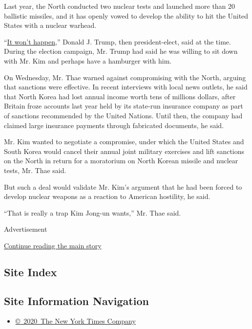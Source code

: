 Last year, the North conducted two nuclear tests and launched more than
20 ballistic missiles, and it has openly vowed to develop the ability to
hit the United States with a nuclear warhead.

``\href{https://www.nytimes.com/2017/01/02/world/asia/trump-twitter-north-korea-missiles-china.html}{It
won't happen},'' Donald J. Trump, then president-elect, said at the
time. During the election campaign, Mr. Trump had said he was willing to
sit down with Mr. Kim and perhaps have a hamburger with him.

On Wednesday, Mr. Thae warned against compromising with the North,
arguing that sanctions were effective. In recent interviews with local
news outlets, he said that North Korea had lost annual income worth tens
of millions dollars, after Britain froze accounts last year held by its
state-run insurance company as part of sanctions recommended by the
United Nations. Until then, the company had claimed large insurance
payments through fabricated documents, he said.

Mr. Kim wanted to negotiate a compromise, under which the United States
and South Korea would cancel their annual joint military exercises and
lift sanctions on the North in return for a moratorium on North Korean
missile and nuclear tests, Mr. Thae said.

But such a deal would validate Mr. Kim's argument that he had been
forced to develop nuclear weapons as a reaction to American hostility,
he said.

``That is really a trap Kim Jong-un wants,'' Mr. Thae said.

Advertisement

\protect\hyperlink{after-bottom}{Continue reading the main story}

\hypertarget{site-index}{%
\subsection{Site Index}\label{site-index}}

\hypertarget{site-information-navigation}{%
\subsection{Site Information
Navigation}\label{site-information-navigation}}

\begin{itemize}
\tightlist
\item
  \href{https://help.nytimes.com/hc/en-us/articles/115014792127-Copyright-notice}{©~2020~The
  New York Times Company}
\end{itemize}


